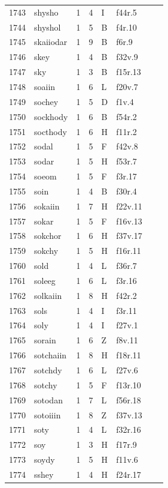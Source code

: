 \documentclass[11pt,a4paper]{article}
\begin{document}
\begin{landscape}
\begin{longtable}{@{}r>{\ttfamily}lrrl>{\ttfamily}l>{\raggedright\arraybackslash}p{80mm}>{\raggedright\arraybackslash}p{36mm}@{}}
1743 & shysho & 1 & 4 & I & f44r.5 &  & \\
1744 & shyshol & 1 & 5 & B & f4r.10 &  & \\
1745 & skaiiodar & 1 & 9 & B & f6r.9 &  & \\
1746 & skey & 1 & 4 & B & f32v.9 &  & \\
1747 & sky & 1 & 3 & B & f15r.13 &  & \\
1748 & soaiin & 1 & 6 & L & f20v.7 &  & \\
1749 & sochey & 1 & 5 & D & f1v.4 &  & \\
1750 & sockhody & 1 & 6 & B & f54r.2 &  & \\
1751 & socthody & 1 & 6 & H & f11r.2 &  & \\
1752 & sodal & 1 & 5 & F & f42v.8 &  & \\
1753 & sodar & 1 & 5 & H & f53r.7 &  & \\
1754 & soeom & 1 & 5 & F & f3r.17 &  & \\
1755 & soin & 1 & 4 & B & f30r.4 &  & \\
1756 & sokaiin & 1 & 7 & H & f22v.11 &  & \\
1757 & sokar & 1 & 5 & F & f16v.13 &  & \\
1758 & sokchor & 1 & 6 & H & f37v.17 &  & \\
1759 & sokchy & 1 & 5 & H & f16r.11 &  & \\
1760 & sold & 1 & 4 & L & f36r.7 &  & \\
1761 & soleeg & 1 & 6 & L & f3r.16 &  & \\
1762 & solkaiin & 1 & 8 & H & f42r.2 &  & \\
1763 & sols & 1 & 4 & I & f3r.11 &  & \\
1764 & soly & 1 & 4 & I & f27v.1 &  & \\
1765 & sorain & 1 & 6 & Z & f8v.11 &  & \\
1766 & sotchaiin & 1 & 8 & H & f18r.11 &  & \\
1767 & sotchdy & 1 & 6 & L & f27v.6 &  & \\
1768 & sotchy & 1 & 5 & F & f13r.10 &  & \\
1769 & sotodan & 1 & 7 & L & f56r.18 &  & \\
1770 & sotoiiin & 1 & 8 & Z & f37v.13 &  & \\
1771 & soty & 1 & 4 & L & f32r.16 &  & \\
1772 & soy & 1 & 3 & H & f17r.9 &  & \\
1773 & soydy & 1 & 5 & H & f11v.6 &  & \\
1774 & sshey & 1 & 4 & H & f24r.17 &  & \\

\end{longtable}
\end{landscape}
\end{document}
